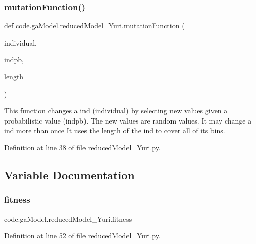 \subsubsection{\texorpdfstring{mutation\+Function()}{mutationFunction()}}
{\footnotesize\ttfamily def code.\+ga\+Model.\+reduced\+Model\+\_\+\+Yuri.\+mutation\+Function (\begin{DoxyParamCaption}\item[{}]{individual,  }\item[{}]{indpb,  }\item[{}]{length }\end{DoxyParamCaption})}

\begin{DoxyVerb}This function changes a ind (individual) by selecting new values given a probabilistic value (indpb).
The new values are random values. It may change a ind more than once
It uses the length of the ind to cover all of its bins.
\end{DoxyVerb}
 

Definition at line 38 of file reduced\+Model\+\_\+\+Yuri.\+py.



\subsection{Variable Documentation}
\mbox{\label{namespacecode_1_1ga_model_1_1reduced_model___yuri_acf335d8330ee303ad3fb0eef5943ebcd}} 
\subsubsection{\texorpdfstring{fitness}{fitness}}
{\footnotesize\ttfamily code.\+ga\+Model.\+reduced\+Model\+\_\+\+Yuri.\+fitness}



Definition at line 52 of file reduced\+Model\+\_\+\+Yuri.\+py.

\mbox{\label{namespacecode_1_1ga_model_1_1reduced_model___yuri_a45d8e7477fd825ec883e666f62c7adb8}} 
